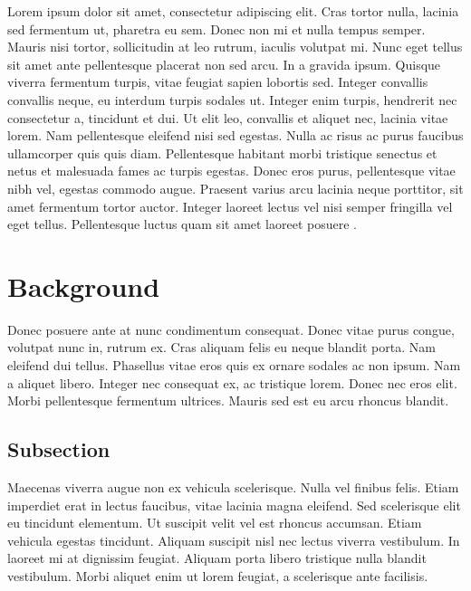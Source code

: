 \documentclass[11pt,conference]{IEEEtran}
\begin{document}
Lorem ipsum dolor sit amet, consectetur adipiscing elit. Cras tortor nulla, lacinia sed fermentum ut, pharetra eu sem. Donec non mi et nulla tempus semper. Mauris nisi tortor, sollicitudin at leo rutrum, iaculis volutpat mi. Nunc eget tellus sit amet ante pellentesque placerat non sed arcu. In a gravida ipsum. Quisque viverra fermentum turpis, vitae feugiat sapien lobortis sed. Integer convallis convallis neque, eu interdum turpis sodales ut. Integer enim turpis, hendrerit nec consectetur a, tincidunt et dui. Ut elit leo, convallis et aliquet nec, lacinia vitae lorem. Nam pellentesque eleifend nisi sed egestas. Nulla ac risus ac purus faucibus ullamcorper quis quis diam. Pellentesque habitant morbi tristique senectus et netus et malesuada fames ac turpis egestas. Donec eros purus, pellentesque vitae nibh vel, egestas commodo augue. Praesent varius arcu lacinia neque porttitor, sit amet fermentum tortor auctor. Integer laoreet lectus vel nisi semper fringilla vel eget tellus. Pellentesque luctus quam sit amet laoreet posuere \cite{test}.

%

\section{Background} \label{background}

Donec posuere ante at nunc condimentum consequat. Donec vitae purus congue, volutpat nunc in, rutrum ex. Cras aliquam felis eu neque blandit porta. Nam eleifend dui tellus. Phasellus vitae eros quis ex ornare sodales ac non ipsum. Nam a aliquet libero. Integer nec consequat ex, ac tristique lorem. Donec nec eros elit. Morbi pellentesque fermentum ultrices. Mauris sed est eu arcu rhoncus blandit. 

\subsection{Subsection}

 Maecenas viverra augue non ex vehicula scelerisque. Nulla vel finibus felis. Etiam imperdiet erat in lectus faucibus, vitae lacinia magna eleifend. Sed scelerisque elit eu tincidunt elementum. Ut suscipit velit vel est rhoncus accumsan. Etiam vehicula egestas tincidunt. Aliquam suscipit nisl nec lectus viverra vestibulum. In laoreet mi at dignissim feugiat. Aliquam porta libero tristique nulla blandit vestibulum. Morbi aliquet enim ut lorem feugiat, a scelerisque ante facilisis. 
\end{document}
